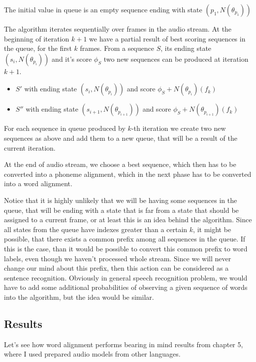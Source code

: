 \documentclass[12pt,a4paper,english]{article}
\begin{document}
The initial value in queue is an empty sequence ending with state $(p_1, N(\theta_{p_1}))$

\newpage

The algorithm iterates sequentially over frames in the audio stream. \newline
At the beginning of iteration $k+1$ we have a partial result of best scoring sequences in the queue, for the first $k$ frames. \newline
From a sequence $S$, its ending state $(s_i, N(\theta_{p_i}))$ and it's score $\phi_S$ two new sequences can be produced at iteration $k+1$. 
\begin{itemize}
    \item $S'$ with ending state $(s_i, N(\theta_{p_i}))$ and score $\phi_S + N(\theta_{p_i})(f_k)$
    \item $S''$ with ending state $(s_{i+1}, N(\theta_{p_{i+1}}))$ and score $\phi_S+N(\theta_{p_{i+1}})(f_k)$
\end{itemize}
For each sequence in queue produced by $k$-th iteration we create two new sequences as above and add them to a new queue, that will be a result of the current iteration. \newline

At the end of audio stream, we choose a best sequence, which then has to be converted into a phoneme alignment, which in the next phase has to be converted into a word alignment. \newline

Notice that it is highly unlikely that we will be having some sequences in the queue, that will be ending with a state that is far from a state that should be assigned to a current frame, or at least this is an idea behind the algorithm. Since all states from the queue have indexes greater than a certain $k$, it might be possible, that there exists a common prefix among all sequences in the queue. If this is the case, than it would be possible to convert this common prefix to word labels, even though we haven't processed whole stream. Since we will never change our mind about this prefix, then this action can be considered as a sentence recognition. \newline
Obviously in general speech recognition problem, we would have to add some additional probabilities of observing a given sequence of words into the algorithm, but the idea would be similar.

\newpage

\subsection{Results}
Let's see how word alignment performs bearing in mind results from chapter 5, where I used prepared audio models from other languages. \newline
\end{document}
